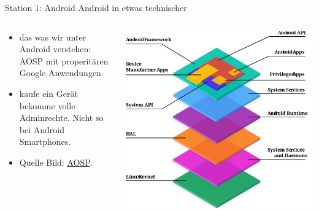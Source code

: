 \documentclass[14pt,compress,usenames,dvipsnames,aspectratio=169]{beamer}
\begin{document}
\begin{frame}{Station 1: Android}
    Android in etwas technischer
    \begin{columns}
        \begin{column}{0.5\textwidth}
            \begin{itemize}
                \item das was wir unter Android verstehen: AOSP mit properitären Google Anwendungen
                \item kaufe ein Gerät bekomme volle Adminrechte. Nicht so bei Android Smartphones.
                \item Quelle Bild: \href{https://source.android.com/docs/core/architecture}{AOSP}.
            \end{itemize}
        \end{column}
        \begin{column}{0.5\textwidth}  %
            \begin{center}
                \includegraphics[width=1.0\textwidth]{Screenshot from 2025-05-09 20-58-01.png}      
            \end{center}
        \end{column}
    \end{columns}


\end{frame}
\end{document}
